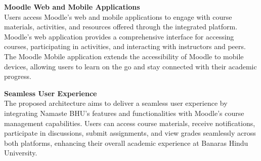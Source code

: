 \textbf{Moodle Web and Mobile Applications}\\
Users access Moodle's web and mobile applications to engage with course materials, activities, and resources offered through the integrated platform. Moodle's web application provides a comprehensive interface for accessing courses, participating in activities, and interacting with instructors and peers. The Moodle Mobile application extends the accessibility of Moodle to mobile devices, allowing users to learn on the go and stay connected with their academic progress.

\textbf{Seamless User Experience}\\
The proposed architecture aims to deliver a seamless user experience by integrating Namaste BHU's features and functionalities with Moodle's course management capabilities. Users can access course materials, receive notifications, participate in discussions, submit assignments, and view grades seamlessly across both platforms, enhancing their overall academic experience at Banaras Hindu University.
